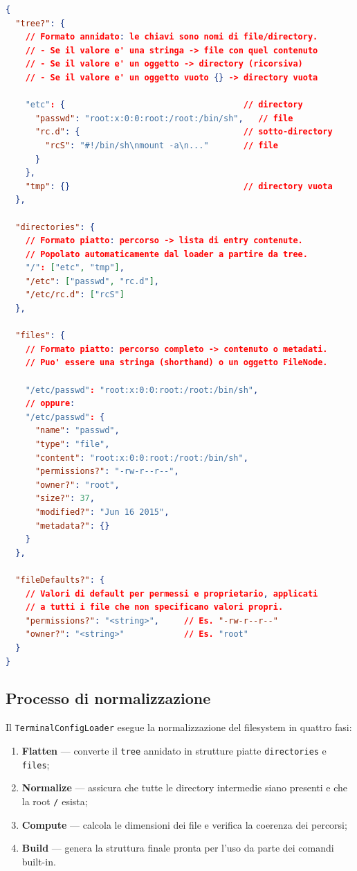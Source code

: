 \begin{lstlisting}[language=json]
{
  "tree?": {
    // Formato annidato: le chiavi sono nomi di file/directory.
    // - Se il valore e' una stringa -> file con quel contenuto
    // - Se il valore e' un oggetto -> directory (ricorsiva)
    // - Se il valore e' un oggetto vuoto {} -> directory vuota

    "etc": {                                    // directory
      "passwd": "root:x:0:0:root:/root:/bin/sh",   // file
      "rc.d": {                                 // sotto-directory
        "rcS": "#!/bin/sh\nmount -a\n..."       // file
      }
    },
    "tmp": {}                                   // directory vuota
  },

  "directories": {
    // Formato piatto: percorso -> lista di entry contenute.
    // Popolato automaticamente dal loader a partire da tree.
    "/": ["etc", "tmp"],
    "/etc": ["passwd", "rc.d"],
    "/etc/rc.d": ["rcS"]
  },

  "files": {
    // Formato piatto: percorso completo -> contenuto o metadati.
    // Puo' essere una stringa (shorthand) o un oggetto FileNode.

    "/etc/passwd": "root:x:0:0:root:/root:/bin/sh",
    // oppure:
    "/etc/passwd": {
      "name": "passwd",
      "type": "file",
      "content": "root:x:0:0:root:/root:/bin/sh",
      "permissions?": "-rw-r--r--",
      "owner?": "root",
      "size?": 37,
      "modified?": "Jun 16 2015",
      "metadata?": {}
    }
  },

  "fileDefaults?": {
    // Valori di default per permessi e proprietario, applicati
    // a tutti i file che non specificano valori propri.
    "permissions?": "<string>",     // Es. "-rw-r--r--"
    "owner?": "<string>"            // Es. "root"
  }
}
\end{lstlisting}

\subsection{Processo di normalizzazione}

Il \texttt{TerminalConfigLoader} esegue la normalizzazione del filesystem in quattro fasi:

\begin{enumerate}
    \item \textbf{Flatten} --- converte il \texttt{tree} annidato in strutture piatte \texttt{directories} e \texttt{files};
    \item \textbf{Normalize} --- assicura che tutte le directory intermedie siano presenti e che la root \texttt{/} esista;
    \item \textbf{Compute} --- calcola le dimensioni dei file e verifica la coerenza dei percorsi;
    \item \textbf{Build} --- genera la struttura finale pronta per l'uso da parte dei comandi built-in.
\end{enumerate}


